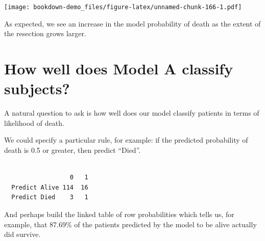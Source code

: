 \documentclass[]{book}
\newenvironment{Shaded}{\begin{snugshade}}{\end{snugshade}}
\newcommand{\KeywordTok}[1]{\textcolor[rgb]{0.13,0.29,0.53}{\textbf{#1}}}
\newcommand{\DecValTok}[1]{\textcolor[rgb]{0.00,0.00,0.81}{#1}}
\newcommand{\FloatTok}[1]{\textcolor[rgb]{0.00,0.00,0.81}{#1}}
\newcommand{\StringTok}[1]{\textcolor[rgb]{0.31,0.60,0.02}{#1}}
\newcommand{\OperatorTok}[1]{\textcolor[rgb]{0.81,0.36,0.00}{\textbf{#1}}}
\newcommand{\NormalTok}[1]{#1}
\theoremstyle{definition}
\theoremstyle{definition}
\theoremstyle{definition}
\theoremstyle{remark}
\begin{document}
\texttt{[image: bookdown-demo\_files/figure-latex/unnamed-chunk-166-1.pdf]}

As expected, we see an increase in the model probability of death as the
extent of the resection grows larger.

\section{How well does Model A classify
subjects?}\label{how-well-does-model-a-classify-subjects}

A natural question to ask is how well does our model classify patients
in terms of likelihood of death.

We could specify a particular rule, for example: if the predicted
probability of death is 0.5 or greater, then predict ``Died''.

\begin{Shaded}
\end{Shaded}

\begin{verbatim}
               
                  0   1
  Predict Alive 114  16
  Predict Died    3   1
\end{verbatim}

And perhaps build the linked table of row probabilities which tells us,
for example, that 87.69\% of the patients predicted by the model to be
alive actually did survive.

\begin{Shaded}
\end{Shaded}
\end{document}
